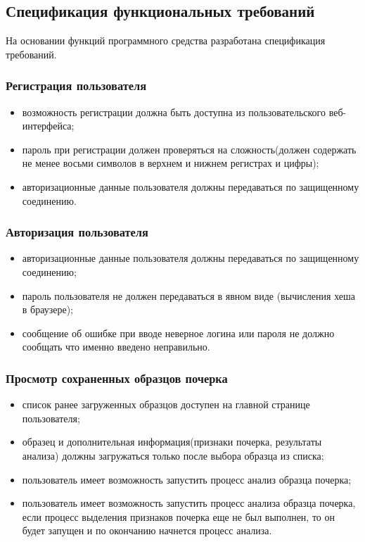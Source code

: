 \subsection{Спецификация функциональных требований}
На основании функций программного средства разработана спецификация требований. 
\subsubsection{Регистрация пользователя}
\label{sec:freq:reg}
\begin{itemize}
	\item возможность регистрации должна быть доступна из пользовательского веб-интерфейса;
	\item пароль при регистрации должен проверяться на сложность(должен содержать не менее восьми символов в верхнем и нижнем регистрах и \mbox{цифры);}
	\item авторизационные данные пользователя должны передаваться по защищенному соединению.
\end{itemize}

\subsubsection{Авторизация пользователя}
\label{sec:freq:auth}
\begin{itemize}
	\item авторизационные данные пользователя должны передаваться по защищенному соединению;
	\item пароль пользователя не должен передаваться в явном виде (вычисления хеша в браузере);
 	\item сообщение об ошибке при вводе неверное логина или пароля не должно сообщать что именно введено неправильно.
\end{itemize}

\subsubsection{Просмотр сохраненных образцов почерка}
\label{sec:freq:show}
\begin{itemize}
	\item список ранее загруженных образцов доступен на главной странице пользователя;
	\item образец и дополнительная информация(признаки почерка, результаты анализа) должны загружаться только после выбора образца из списка;
	\item пользователь имеет возможность запустить процесс анализ образца почерка;
	\item пользователь имеет возможность запустить процесс анализа образца почерка, если процесс выделения признаков почерка еще не был выполнен, то он будет запущен и по окончанию начнется процесс анализа.
\end{itemize}

